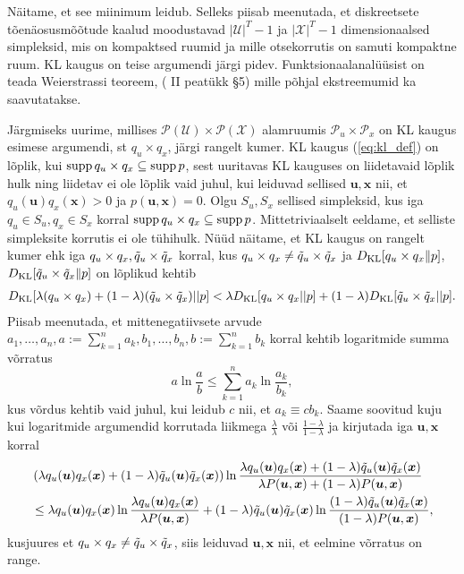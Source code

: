 Näitame, et see miinimum leidub. Selleks piisab meenutada, et diskreetsete tõenäosusmõõtude kaalud moodustavad $|\mathcal{U}|^T-1$ ja $|\mathcal{X}|^T -1$ dimensionaalsed simpleksid, mis on kompaktsed ruumid ja mille otsekorrutis on samuti kompaktne ruum. KL kaugus on teise argumendi järgi pidev. Funktsionaalanalüüsist on teada Weierstrassi teoreem, (\cite{Oja.1991}{ II peatükk §5}) mille põhjal ekstreemumid ka saavutatakse.

Järgmiseks uurime, millises $\mathcal{P}(\mathcal{U}) \times \mathcal{P}(\mathcal{X})$ alamruumis $\mathcal{P}_u \times \mathcal{P}_x$ on KL kaugus esimese argumendi, st $q_u \times q_x$, järgi rangelt kumer. KL kaugus (\ref{eq:kl_def}) on lõplik, kui $\operatorname{supp} q_u \times q_x \subseteq \operatorname{supp} p$, sest uuritavas KL kauguses on liidetavaid lõplik hulk ning liidetav ei ole lõplik vaid juhul, kui leiduvad sellised $\bm{u}, \bm{x}$ nii, et $q_u(\bm{u})q_x(\bm{x}) > 0$ ja $p(\bm{u},\bm{x}) = 0$. Olgu $S_u, S_x$ sellised simpleksid, kus iga $q_u \in S_u, q_x \in S_x$ korral $\operatorname{supp} q_u \times q_x \subseteq \operatorname{supp} p$. Mittetriviaalselt eeldame, et selliste simpleksite korrutis ei ole tühihulk. Nüüd näitame, et KL kaugus on rangelt kumer ehk iga $q_u\times q_x, \Tilde{q}_u\times \Tilde{q}_x$ korral, kus $q_u\times q_x \ne \Tilde{q}_u\times \Tilde{q}_x$ ja $D_{\mathrm{KL}}[q_u \times q_x \| p]$, $D_{\mathrm{KL}}[\Tilde{q}_u \times \Tilde{q}_x \| p]$ on lõplikud kehtib
\begin{align*}
\label{ineq:strong_convexity}
D_{\mathrm{KL}}[\lambda (q_u\times q_x) + (1-\lambda) (\Tilde{q}_u\times \Tilde{q}_x) || p] < \lambda D_{\mathrm{KL}}[q_u\times q_x  || p] + (1 - \lambda) D_{\mathrm{KL}}[\Tilde{q}_u\times \Tilde{q}_x || p].
\end{align*}
Piisab meenutada, et mittenegatiivsete arvude $a_1,\ldots,a_n, a:=\sum_{k=1}^n a_k, b_1,\ldots,b_n, b:=\sum_{k=1}^n b_k$ korral kehtib logaritmide summa võrratus
$$ a \ln \frac{a}{b} \le \sum_{k=1}^n a_k \ln \frac{a_k}{b_k}, $$
kus võrdus kehtib vaid juhul, kui leidub $c$ nii, et $a_k \equiv cb_k$. Saame soovitud kuju kui logaritmide argumendid korrutada liikmega $\frac{\lambda}{\lambda}$ või $\frac{1-\lambda}{1-\lambda} $ ja kirjutada iga $\bm{u},\bm{x}$ korral
\begin{align*}
    & \left( \lambda q_u(\bm{u})q_x(\bm{x}) + (1-\lambda) \Tilde{q}_u(\bm{u})\Tilde{q}_x(\bm{x}) \right) \ln \frac{\lambda q_u(\bm{u})q_x(\bm{x}) + (1-\lambda) \Tilde{q}_u(\bm{u})\Tilde{q}_x(\bm{x}) }{\lambda P(\bm{u},\bm{x}) + (1-\lambda)P(\bm{u},\bm{x})}\\
    &\le \lambda q_u(\bm{u})q_x(\bm{x}) \ln \frac{\lambda q_u(\bm{u})q_x(\bm{x})}{\lambda P(\bm{u},\bm{x})} + (1-\lambda)\Tilde{q}_u(\bm{u})\Tilde{q}_x(\bm{x}) \ln \frac{(1-\lambda) \Tilde{q}_u(\bm{u})\Tilde{q}_x(\bm{x})}{(1-\lambda)P(\bm{u},\bm{x})},
\end{align*}
kusjuures et $q_u\times q_x \ne \Tilde{q}_u\times \Tilde{q}_x$, siis leiduvad $\bm{u},\bm{x}$ nii, et eelmine võrratus on range.

